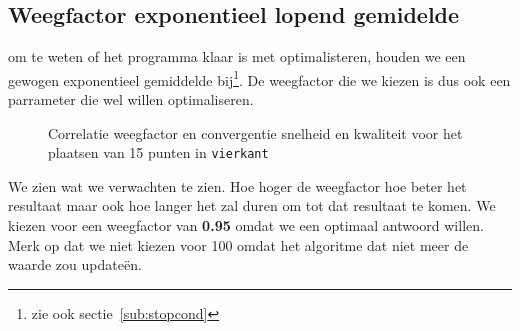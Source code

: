 \subsection{Weegfactor exponentieel lopend gemidelde}
\label{sub:weightingFactor}
om te weten of het programma klaar is met optimalisteren, houden we een gewogen exponentieel gemiddelde bij\footnote{zie ook sectie~\ref{sub:stopcond}}. De weegfactor die we kiezen is dus ook een parrameter die wel willen optimaliseren.
\begin{figure}[H]
\caption{Correlatie weegfactor en convergentie snelheid en kwaliteit voor het plaatsen van 15 punten in \texttt{vierkant}}
\label{graf:weightingFactor}
\end{figure}
We zien wat we verwachten te zien. Hoe hoger de weegfactor hoe beter het resultaat maar ook hoe langer het zal duren om tot dat resultaat te komen. 
We kiezen voor een weegfactor van \textbf{0.95} omdat we een optimaal antwoord willen. Merk op dat we niet kiezen voor 100 omdat het algoritme dat niet meer de waarde zou updateën. 

%